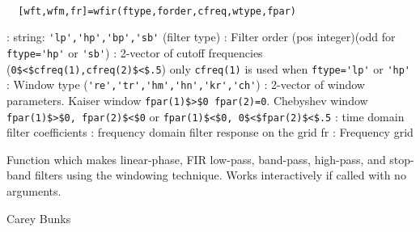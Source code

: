 
\begin{mandesc}
   \\ %
\end{mandesc}
\begin{calling_sequence}
\begin{verbatim}
  [wft,wfm,fr]=wfir(ftype,forder,cfreq,wtype,fpar)  
\end{verbatim}
\end{calling_sequence}
\begin{parameters}
  \begin{varlist}
    : string: \verb!'lp','hp','bp','sb'! (filter type)
    : Filter order (pos integer)(odd for \verb!ftype='hp'! or \verb!'sb'!)
    : 2-vector of cutoff frequencies (\verb!0$<$cfreq(1),cfreq(2)$<$.5!)  only \verb!cfreq(1)! is used when \verb!ftype='lp'! or \verb!'hp'!
    : Window type (\verb!'re','tr','hm','hn','kr','ch'!)
    : 2-vector of window parameters. Kaiser window \verb!fpar(1)$>$0 fpar(2)=0!. Chebyshev window  \verb!fpar(1)$>$0, fpar(2)$<$0! or \verb!fpar(1)$<$0, 0$<$fpar(2)$<$.5!
    : time domain filter coefficients
    : frequency domain filter response on the grid fr
    : Frequency grid
  \end{varlist}
\end{parameters}
\begin{mandescription}
  Function which makes linear-phase, FIR low-pass, band-pass,
  high-pass, and stop-band filters
  using the windowing technique.
  Works interactively if called with no arguments.
\end{mandescription}
\begin{authors}
  Carey Bunks
\end{authors}
